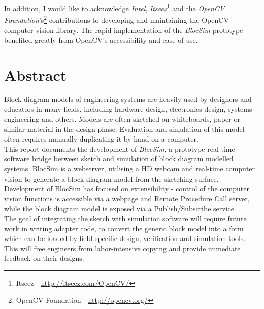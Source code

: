 In addition, I would like to acknowledge \textit{Intel}, \textit{Itseez}\footnote{Itseez - \url{http://itseez.com/OpenCV/}} and the \textit{OpenCV Foundation}'s\footnote{OpenCV Foundation - \url{http://opencv.org/}} contributions to developing and maintaining the OpenCV computer vision library. The rapid implementation of the \textit{BlocSim} prototype benefited greatly from OpenCV's accessibility and ease of use.


\chapter{Abstract}

Block diagram models of engineering systems are heavily used by designers and educators in many fields, including hardware design, electronics design, systems engineering and others. Models are often sketched on whiteboards, paper or similar material in the design phase. Evaluation and simulation of this model often requires manually duplicating it by hand on a computer.
\\

This report documents the development of \textit{BlocSim}, a prototype real-time software bridge between sketch and simulation of block diagram modelled systems. BlocSim is a webserver, utilising a HD webcam and real-time computer vision to generate a block diagram model from the sketching surface. Development of BlocSim has focused on extensibility - control of the computer vision functions is accessible via a webpage and Remote Procedure Call server, while the block diagram model is exposed via a Publish/Subscribe service.
\\

The goal of integrating the sketch with simulation software will require future work in writing adapter code, to convert the generic block model into a form which can be loaded by field-specific design, verification and simulation tools. This will free engineers from labor-intensive copying and provide immediate feedback on their designs.


\begin{comment}

\end{comment}
